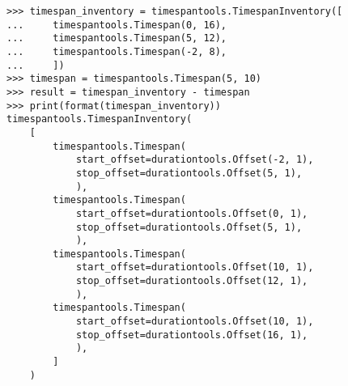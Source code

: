 \begin{comment}
<abjad>
timespan_inventory = timespantools.TimespanInventory([
    timespantools.Timespan(0, 16),
    timespantools.Timespan(5, 12),
    timespantools.Timespan(-2, 8),
    ])
timespan = timespantools.Timespan(5, 10)
result = timespan_inventory - timespan
print(format(timespan_inventory))
</abjad>
\end{comment}

\begin{singlespacing}
\begin{lstlisting}
>>> timespan_inventory = timespantools.TimespanInventory([
...     timespantools.Timespan(0, 16),
...     timespantools.Timespan(5, 12),
...     timespantools.Timespan(-2, 8),
...     ])
>>> timespan = timespantools.Timespan(5, 10)
>>> result = timespan_inventory - timespan
>>> print(format(timespan_inventory))
timespantools.TimespanInventory(
    [
        timespantools.Timespan(
            start_offset=durationtools.Offset(-2, 1),
            stop_offset=durationtools.Offset(5, 1),
            ),
        timespantools.Timespan(
            start_offset=durationtools.Offset(0, 1),
            stop_offset=durationtools.Offset(5, 1),
            ),
        timespantools.Timespan(
            start_offset=durationtools.Offset(10, 1),
            stop_offset=durationtools.Offset(12, 1),
            ),
        timespantools.Timespan(
            start_offset=durationtools.Offset(10, 1),
            stop_offset=durationtools.Offset(16, 1),
            ),
        ]
    )
\end{lstlisting}
\end{singlespacing}

\begin{comment}
<abjad>
timespan_inventory = timespantools.TimespanInventory([
    timespantools.Timespan(0, 3),
    timespantools.Timespan(3, 6),
    timespantools.Timespan(6, 10),
    ])
left, right = timespan_inventory.split_at_offset(4)
print(format(left))
print(format(right))
</abjad>
\end{comment}

